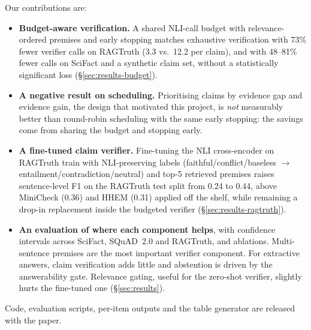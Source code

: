 Our contributions are:
\begin{itemize}
\item \textbf{Budget-aware verification.} A shared NLI-call budget with relevance-ordered premises and early stopping matches exhaustive verification with 73\% fewer verifier calls on RAGTruth (3.3 vs.\ 12.2 per claim), and with 48--81\% fewer calls on SciFact and a synthetic claim set, without a statistically significant loss (\S\ref{sec:results-budget}).
\item \textbf{A negative result on scheduling.} Prioritising claims by evidence gap and evidence gain, the design that motivated this project, is \emph{not} measurably better than round-robin scheduling with the same early stopping: the savings come from sharing the budget and stopping early.
\item \textbf{A fine-tuned claim verifier.} Fine-tuning the NLI cross-encoder on RAGTruth train with NLI-preserving labels (faithful/conflict/baseless $\rightarrow$ entailment/contradiction/neutral) and top-5 retrieved premises raises sentence-level F1 on the RAGTruth test split from 0.24 to 0.44, above MiniCheck (0.36) and HHEM (0.31) applied off the shelf, while remaining a drop-in replacement inside the budgeted verifier (\S\ref{sec:results-ragtruth}).
\item \textbf{An evaluation of where each component helps}, with confidence intervals across SciFact, SQuAD~2.0 and RAGTruth, and ablations. Multi-sentence premises are the most important verifier component. For extractive answers, claim verification adds little and abstention is driven by the answerability gate. Relevance gating, useful for the zero-shot verifier, slightly hurts the fine-tuned one (\S\ref{sec:results}).
\end{itemize}
Code, evaluation scripts, per-item outputs and the table generator are released with the paper.
